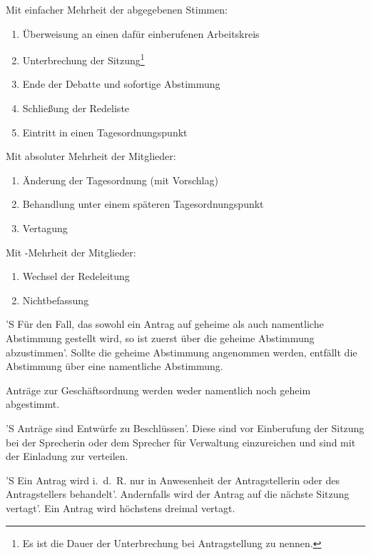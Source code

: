 \documentclass[%
	parskip=half,
]{scrartcl}
\newcounter{enumitem}
\begin{document}
\begin{contract}
Mit einfacher Mehrheit der abgegebenen Stimmen:
\begin{enumerate}[\qquad a)]
	\setcounter{enumi}{\value{enumitem}}
	\item Überweisung an einen dafür einberufenen Arbeitskreis
	\item Unterbrechung der Sitzung\footnote{Es ist die Dauer der Unterbrechung bei Antragstellung zu nennen.}
	\item Ende der Debatte und sofortige Abstimmung
	\item Schließung der Redeliste
	\item Eintritt in einen Tagesordnungspunkt
	\setcounter{enumitem}{\value{enumi}}
\end{enumerate}

Mit absoluter Mehrheit der Mitglieder:
\begin{enumerate}[\qquad a)]
	\setcounter{enumi}{\value{enumitem}}
	\item Änderung der Tagesordnung (mit Vorschlag)
	\item Behandlung unter einem späteren Tagesordnungspunkt
	\item Vertagung
	\setcounter{enumitem}{\value{enumi}}
\end{enumerate}

Mit -Mehrheit der Mitglieder:
\begin{enumerate}[\qquad a)]
	\setcounter{enumi}{\value{enumitem}}
	\item Wechsel der Redeleitung
	\item Nichtbefassung
\end{enumerate}


'S Für den Fall, das sowohl ein Antrag auf geheime als auch namentliche Abstimmung gestellt wird, so ist zuerst über die
geheime Abstimmung abzustimmen'. Sollte die geheime Abstimmung angenommen werden, entfällt die Abstimmung über eine
namentliche Abstimmung.

Anträge zur Geschäftsordnung werden weder namentlich noch geheim abgestimmt.


'S Anträge sind Entwürfe zu Beschlüssen'. Diese sind vor Einberufung der Sitzung bei der Sprecherin oder dem Sprecher
für Verwaltung einzureichen und sind mit der Einladung zur verteilen.

'S Ein Antrag wird i.~d.~R. nur in Anwesenheit der Antragstellerin oder des Antragstellers behandelt'. Andernfalls wird
der Antrag auf die nächste Sitzung vertagt'. Ein Antrag wird höchstens dreimal vertagt.


\end{contract}
\end{document}
